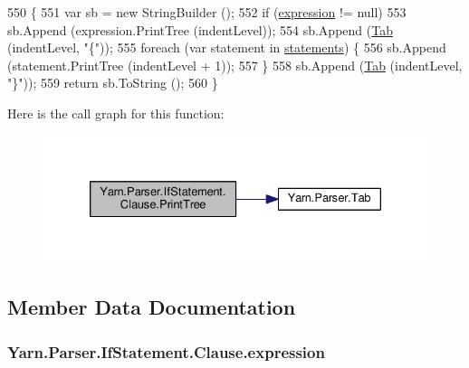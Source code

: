 \begin{DoxyCode}
550                                                            \{
551                     var sb = \textcolor{keyword}{new} StringBuilder ();
552                     \textcolor{keywordflow}{if} (\hyperlink{a00050_a1abd1f7c41f68ccdf64074ea49365be9}{expression} != null)
553                         sb.Append (expression.PrintTree (indentLevel));
554                     sb.Append (\hyperlink{a00149_aa8fa36b46de12a1c561d77b99c4b9ae3}{Tab} (indentLevel, \textcolor{stringliteral}{"\{"}));
555                     \textcolor{keywordflow}{foreach} (var statement \textcolor{keywordflow}{in} \hyperlink{a00050_a6f4765482e98ed042e38a0ede13f171f}{statements}) \{
556                         sb.Append (statement.PrintTree (indentLevel + 1));
557                     \}
558                     sb.Append (\hyperlink{a00149_aa8fa36b46de12a1c561d77b99c4b9ae3}{Tab} (indentLevel, \textcolor{stringliteral}{"\}"}));
559                     \textcolor{keywordflow}{return} sb.ToString ();
560                 \}
\end{DoxyCode}


Here is the call graph for this function\-:
\nopagebreak
\begin{figure}[H]
\begin{center}
\leavevmode
\includegraphics[width=330pt]{a00050_a7f4fc9399896512b68fdc7bc7cf818c9_cgraph}
\end{center}
\end{figure}




\subsection{Member Data Documentation}
\hypertarget{a00050_a1abd1f7c41f68ccdf64074ea49365be9}{
\subsubsection[{expression}]{ Yarn.\-Parser.\-If\-Statement.\-Clause.\-expression\hspace{0.3cm}{\ttfamily [package]}}}\label{a00050_a1abd1f7c41f68ccdf64074ea49365be9}


